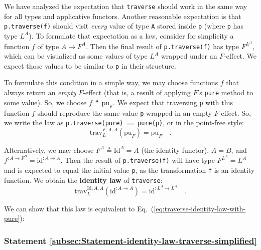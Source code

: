 We have analyzed the expectation that \lstinline!traverse! should
work in the same way for all types and applicative functors. Another
reasonable expectation is that \lstinline!p.traverse(f)! should visit
\emph{every} value of type \lstinline!A! stored inside \lstinline!p!
(where \lstinline!p! has type $L^{A}$). To formulate that expectation
as a law, consider for simplicity a function $f$ of type $A\rightarrow F^{A}$.
Then the final result of \lstinline!p.traverse(f)! has type $F^{L^{A}}$,
which can be visualized as some values of type $L^{A}$ wrapped under
an $F$-effect. We expect those values to be similar to \lstinline!p!
in their structure.

To formulate this condition in a simple way, we may choose functions
$f$ that always return an \emph{empty} $F$-effect (that is, a result
of applying $F$\textsf{'}s \lstinline!pure! method to some value). So, we
choose $f\triangleq\text{pu}_{F}$. We expect that traversing \lstinline!p!
with this function $f$ should reproduce the same value \lstinline!p!
wrapped in an empty $F$-effect. So, we write the law as \lstinline!p.traverse(pure) == pure(p)!,
or in the point-free style:
\begin{equation}
\text{trav}_{L}^{F,A,A}(\text{pu}_{F})=\text{pu}_{F}\quad.\label{eq:traverse-identity-law-with-pure}
\end{equation}

Alternatively, we may choose $F^{A}\triangleq\text{Id}^{A}=A$ (the
identity functor), $A=B$, and $f^{:A\rightarrow F^{B}}=\text{id}^{:A\rightarrow A}$.
Then the result of \lstinline!p.traverse(f)! will have type $F^{L^{A}}=L^{A}$
and is expected to equal the initial value \lstinline!p!, as the
transformation \lstinline!f! is an identity function. We obtain the
\textbf{identity law}
of \lstinline!traverse!:
\begin{equation}
\text{trav}_{L}^{\text{Id},A,A}(\text{id}^{:A\rightarrow A})=\text{id}^{:L^{A}\rightarrow L^{A}}\quad.\label{eq:traverse-identity-law}
\end{equation}

We can show that this law is equivalent to Eq.~(\ref{eq:traverse-identity-law-with-pure}):

\subsubsection{Statement \label{subsec:Statement-identity-law-traverse-simplified}\ref{subsec:Statement-identity-law-traverse-simplified}}

